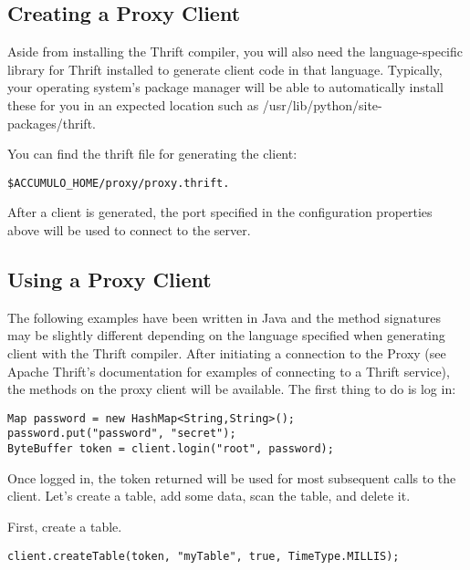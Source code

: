 \subsection{Creating a Proxy Client}

Aside from installing the Thrift compiler, you will also need the language-specific library
for Thrift installed to generate client code in that language. Typically, your operating
system's package manager will be able to automatically install these for you in an expected
location such as /usr/lib/python/site-packages/thrift.

You can find the thrift file for generating the client:

\begingroup\fontsize{8pt}{8pt}\selectfont\begin{verbatim}
$ACCUMULO_HOME/proxy/proxy.thrift.
\end{verbatim}\endgroup

After a client is generated, the port specified in the configuration properties above will be
used to connect to the server.

\subsection{Using a Proxy Client}

The following examples have been written in Java and the method signatures may be
slightly different depending on the language specified when generating client with
the Thrift compiler. After initiating a connection to the Proxy (see Apache Thrift's
documentation for examples of connecting to a Thrift service), the methods on the
proxy client will be available. The first thing to do is log in:

\begingroup\fontsize{8pt}{8pt}\selectfont\begin{verbatim}
Map password = new HashMap<String,String>();
password.put("password", "secret");
ByteBuffer token = client.login("root", password);
\end{verbatim}\endgroup

Once logged in, the token returned will be used for most subsequent calls to the client.
Let's create a table, add some data, scan the table, and delete it.


First, create a table.

\begingroup\fontsize{8pt}{8pt}\selectfont\begin{verbatim}
client.createTable(token, "myTable", true, TimeType.MILLIS);
\end{verbatim}\endgroup


